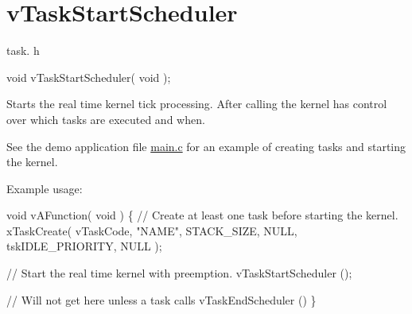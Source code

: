 \hypertarget{group__v_task_start_scheduler}{}\section{v\+Task\+Start\+Scheduler}
\label{group__v_task_start_scheduler}
task. h 
\begin{DoxyPre}void vTaskStartScheduler( void );\end{DoxyPre}


Starts the real time kernel tick processing. After calling the kernel has control over which tasks are executed and when.

See the demo application file \mbox{\hyperlink{main_8c}{main.\+c}} for an example of creating tasks and starting the kernel.

Example usage\+: 
\begin{DoxyPre}
void vAFunction( void )
\{
    // Create at least one task before starting the kernel.
    xTaskCreate( vTaskCode, "NAME", STACK\_SIZE, NULL, tskIDLE\_PRIORITY, NULL );\end{DoxyPre}



\begin{DoxyPre}    // Start the real time kernel with preemption.
    vTaskStartScheduler ();\end{DoxyPre}



\begin{DoxyPre}    // Will not get here unless a task calls vTaskEndScheduler ()
\}
  \end{DoxyPre}
 